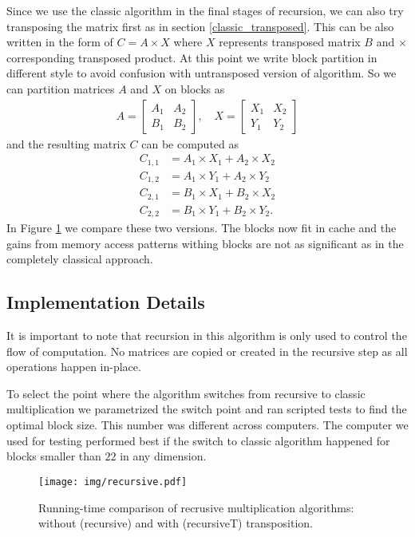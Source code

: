 \documentclass[a4paper,11pt]{article}
\begin{document}
Since we use the classic algorithm in the final stages of recursion, we can also try transposing the matrix first as in section \ref{classic_transposed}. 
This can be also written in the form of $C = A \times X$ where $X$ represents transposed matrix $B$ and $\times$ corresponding transposed product. 
At this point we write block partition in different style to avoid confusion with untransposed version of algorithm. 
So we can partition matrices $A$ and $X$ on blocks as
\begin{align*}
A = 
\begin{bmatrix}
A_{1} & A_{2} \\
B_{1} & B_{2}
\end{bmatrix},
\quad
X = 
\begin{bmatrix}
X_{1} & X_{2} \\
Y_{1} & Y_{2}
\end{bmatrix}
\end{align*}
and the resulting matrix $C$ can be computed as
\begin{align*}
C_{1,1} &= A_{1} \times X_{1} + A_{2}  \times X_{2} \\
C_{1,2} &= A_{1} \times Y_{1} + A_{2}  \times Y_{2} \\
C_{2,1} &= B_{1} \times X_{1} + B_{2}  \times X_{2} \\
C_{2,2} &= B_{1} \times Y_{1} + B_{2}  \times Y_{2}.
\end{align*}
In Figure \ref{fig:recursive} we compare these two versions. The blocks now fit in cache and the gains from memory access patterns withing blocks are not as significant as in the completely classical approach.

\subsection{Implementation Details} 
It is important to note that recursion in this algorithm is only used to control the flow of computation. No matrices are copied or created in the recursive step as all operations happen in-place. 

To select the point where the algorithm switches from recursive to classic multiplication we parametrized the switch point and ran scripted tests to find the optimal block size. This number was different across computers. The computer we used for testing performed best if the switch to classic algorithm happened for blocks smaller than $22$ in any dimension.

\begin{figure}[h]
\centering
\texttt{[image: img/recursive.pdf]}
\caption{Running-time comparison of recrusive multiplication algorithms: without (\textsf{recursive}) and with (\textsf{recursiveT}) transposition.}
\label{fig:recursive}
\end{figure}
\end{document}
